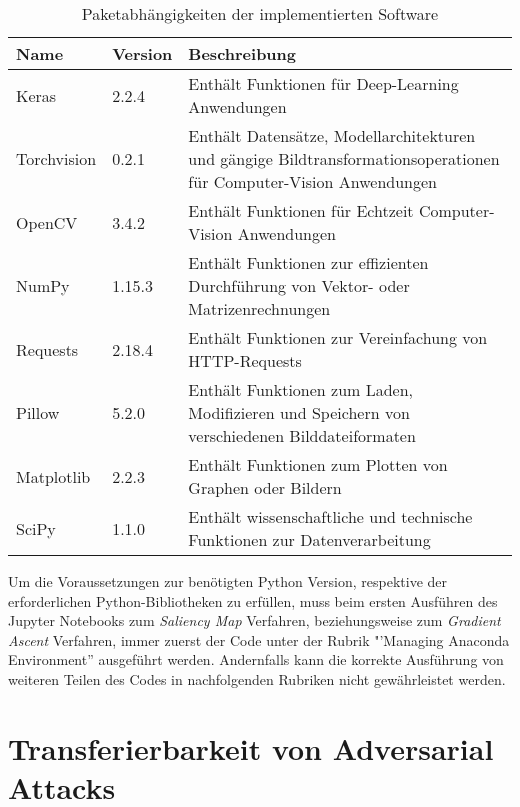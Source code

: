 \begin{table}
	\centering
	\begin{tabular}{|l|l|p{10.4cm}|}
		\hline 
		Name & Version & Beschreibung \\ 
		\hline\hline 
		Keras& 2.2.4  & Enthält Funktionen für Deep-Learning Anwendungen \cite{noauthor_home_nodate} \\ 
		\hline 
		Torchvision& 0.2.1 & Enthält Datensätze, Modellarchitekturen und gängige Bildtransformationsoperationen für Computer-Vision Anwendungen \cite{team_torchvision:_nodate} \\ 
		\hline 
		OpenCV& 3.4.2  & Enthält Funktionen für Echtzeit Computer-Vision Anwendungen \cite{noauthor_opencv_nodate} \\ 
		\hline 
		NumPy&  1.15.3& Enthält Funktionen zur effizienten Durchführung von Vektor- oder Matrizenrechnungen \cite{noauthor_numpy_nodate} \\ 
		\hline 
		Requests& 2.18.4 & Enthält Funktionen zur Vereinfachung von HTTP-Requests \cite{noauthor_requests:_nodate} \\ 
		\hline 
		Pillow& 5.2.0 & Enthält Funktionen zum Laden, Modifizieren und Speichern von verschiedenen Bilddateiformaten \cite{noauthor_pillow_nodate} \\ 
		\hline 
		Matplotlib& 2.2.3 & Enthält Funktionen zum Plotten von Graphen oder Bildern \cite{noauthor_matplotlib:_nodate} \\ 
		\hline 
		SciPy& 1.1.0  & Enthält wissenschaftliche und technische Funktionen zur Datenverarbeitung \cite{noauthor_scipy.org_nodate} \\ 
		\hline 
	\end{tabular} 
	\caption{Paketabhängigkeiten der implementierten Software}
	\label{tab:parameter}
\end{table}

Um die Voraussetzungen zur benötigten Python Version, respektive der erforderlichen Python-Bibliotheken zu erfüllen, muss beim ersten Ausführen des Jupyter Notebooks zum \textit{Saliency Map} Verfahren, beziehungsweise zum \textit{Gradient Ascent} Verfahren, immer zuerst der Code unter der Rubrik "'Managing Anaconda Environment” ausgeführt werden. 
Andernfalls kann die korrekte Ausführung von weiteren Teilen des Codes in nachfolgenden Rubriken nicht gewährleistet werden.

\section{Transferierbarkeit von Adversarial Attacks}


